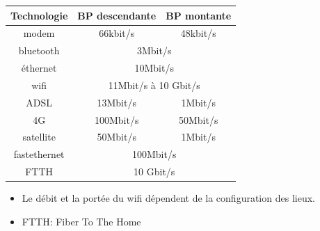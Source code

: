\documentclass[a4paper,11pt]{article}
\begin{document}
\begin{exo}
\begin{center}
    \begin{tabular}{|*{3}{c|}}
        \hline
        Technologie & BP descendante & BP montante \\
        \hline
        modem & 66kbit/s & 48kbit/s\\
        \hline
        bluetooth & \multicolumn{2}{c|}{3Mbit/s}\\
        \hline
        éthernet & \multicolumn{2}{c|}{10Mbit/s}\\
        \hline
        wifi & \multicolumn{2}{c|}{11Mbit/s à 10 Gbit/s}\\
        \hline
        ADSL & 13Mbit/s & 1Mbit/s\\
        \hline
        4G & 100Mbit/s & 50Mbit/s\\
        \hline
        satellite & 50Mbit/s & 1Mbit/s\\
        \hline
        fastethernet & \multicolumn{2}{c|}{100Mbit/s}\\
        \hline
        FTTH & \multicolumn{2}{c|}{10 Gbit/s}\\
        \hline
    \end{tabular}
\end{center}
\begin{aretenir}[Remarque]
\begin{itemize}
    \item Le débit et la portée du wifi dépendent de la configuration des lieux.
    \item FTTH: Fiber To The Home
\end{itemize}
\end{aretenir}
\end{exo}
\end{document}
